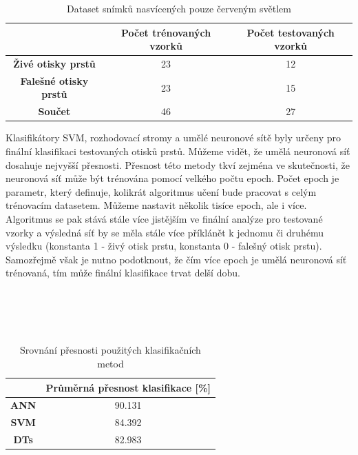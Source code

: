 \capstartfalse
\begin{table}[!htbp]
\centering
\begin{tabular}{|c|c|c|}
\hline
\textbf{}                     & \textbf{Počet trénovaných vzorků} & \textbf{Počet testovaných vzorků} \\ \hline
\textbf{Živé otisky prstů}    & 23                                & 12                                \\ \hline
\textbf{Falešné otisky prstů} & 23                                & 15                                \\ \hline
\textbf{Součet}               & 46                                & 27                                \\ \hline
\end{tabular}
\caption{Dataset snímků nasvícených pouze červeným světlem}
\end{table}
\capstarttrue

Klasifikátory SVM, rozhodovací stromy a umělé neuronové sítě byly určeny pro finální klasifikaci testovaných otisků prstů. Můžeme vidět, že umělá neuronová síť dosahuje nejvyšší přesnosti. Přesnost této metody tkví zejména ve skutečnosti, že neuronová síť může být trénována pomocí velkého počtu epoch. Počet epoch je parametr, který definuje, kolikrát algoritmus učení bude pracovat s celým trénovacím datasetem. \cite{BatchEpochANN} Můžeme nastavit několik tisíce epoch, ale i více. Algoritmus se pak stává stále více jistějším ve finální analýze pro testované vzorky a výsledná síť by se měla stále více příklánět k jednomu či druhému výsledku (konstanta 1 - živý otisk prstu, konstanta 0 - falešný otisk prstu). Samozřejmě však je nutno podotknout, že čím více epoch je umělá neuronová síť trénovaná, tím může finální klasifikace trvat delší dobu. \\\\\\\\\

\capstartfalse
\begin{table}[!htbp]
\centering
\begin{tabular}{|c|c|}
\hline
                             & \textbf{Průměrná přesnost klasifikace {[}\%{]}} \\ \hline
\textbf{ANN} & 90.131                                         \\ \hline
\textbf{SVM}                 & 84.392                                         \\ \hline
\textbf{DTs}   & 82.983                                         \\ \hline
\end{tabular}
\caption{Srovnání přesnosti použitých klasifikačních metod}
\end{table}
\capstarttrue

